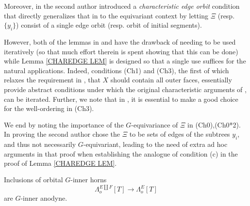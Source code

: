 \documentclass[a4paper,10pt,draft]{article}%
\numberwithin{equation}{section}%
\numberwithin{figure}{section}
\begin{document}
\begin{remark}
\begin{itemize}
Moreover, in \cite[Lemma 7.39]{Per17} the second author introduced a \textit{characteristic edge orbit} condition that directly generalizes that in \cite{MW09}
to the equivariant context 
by letting $\Xi$ (resp. $\{y_i\}$) consist of a single edge orbit (resp. orbit of initial segments).

However, both of the lemmas in \cite{MW09} and \cite{Per17}
have the drawback of needing to be used iteratively
(so that much effort therein is spent showing that this can be done) while Lemma \ref{CHAREDGE LEM} is designed so that a single use suffices for the natural applications.
Indeed, conditions (Ch1) and (Ch3), the first of which relaxes the requirement in \cite{MW09},\cite{Per17} that $X$ should contain all outer faces, essentially provide abstract conditions under which the original characteristic arguments of \cite{MW09},\cite{Per17} can be iterated.
Further, we note that in \cite{MW09},\cite{Per17} it is essential to make a good choice for the well-ordering in (Ch3).

We end by noting the importance of the $G$-equivariance of $\Xi$
in (Ch0),(Ch0*2). In proving \cite[Prop. 7.44]{Per17} the second author chose the $\Xi$ to be sets of edges of the subtrees $y_i$, and thus not necessarily $G$-equivariant,
leading to the need of extra ad hoc arguments in that proof when establishing the analogue of condition (c) in the proof of Lemma \ref{CHAREDGE LEM}.
\end{itemize}
\end{remark}



\begin{proposition} Inclusions of orbital $G$-inner horns
\begin{equation}\label{ORBHORNINC EQ}
	\Lambda_o^{E \amalg F}[T] \to \Lambda_o^{E}[T]
\end{equation}
are $G$-inner anodyne.
\end{proposition}
\end{document}
